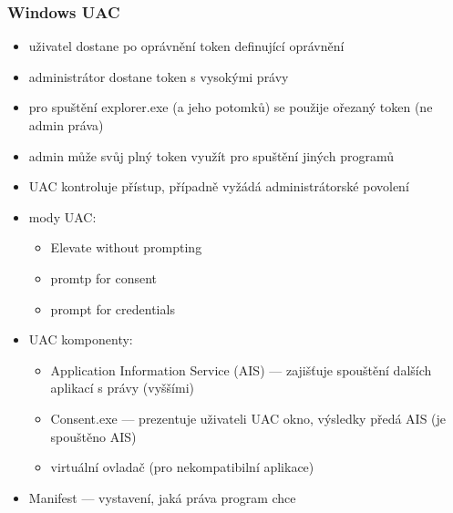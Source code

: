 \subsubsection*{Windows UAC}
\begin{itemize}
    \item uživatel dostane po oprávnění token definující oprávnění
    \item administrátor dostane token s vysokými právy
    \item pro spuštění explorer.exe (a jeho potomků) se použije ořezaný token (ne admin práva)
    \item admin může svůj plný token využít pro spuštění jiných programů
    \item UAC kontroluje přístup, případně vyžádá administrátorské povolení
    \item mody UAC:
    \begin{itemize}
        \item Elevate without prompting
        \item promtp for consent
        \item prompt for credentials
    \end{itemize}
    \item UAC komponenty:
    \begin{itemize}
        \item Application Information Service (AIS) --- zajišťuje spouštění dalších aplikací s právy (vyššími)
        \item Consent.exe --- prezentuje uživateli UAC okno, výsledky předá AIS (je spouštěno AIS)
        \item virtuální ovladač (pro nekompatibilní aplikace)
    \end{itemize}

    \item Manifest --- vystavení, jaká práva program chce 

\end{itemize}